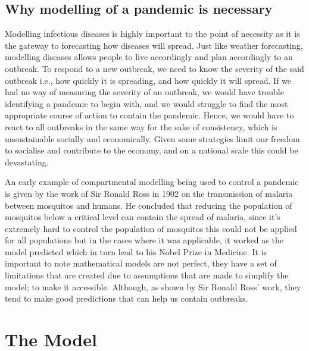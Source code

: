 \documentclass[11pt]{article}
\begin{document}
\subsection{Why modelling of a pandemic is necessary}
Modelling infectious diseases is highly important to the point of necessity as it is the gateway to forecasting how diseases will spread. Just like weather forecasting, modelling diseases allows people to live accordingly and plan accordingly to an outbreak. To respond to a new outbreak, we need to know the severity of the said outbreak i.e., how quickly it is spreading, and how quickly it will spread. If we had no way of measuring the severity of an outbreak, we would have trouble identifying a pandemic to begin with, and we would struggle to find the most appropriate course of action to contain the pandemic. Hence, we would have to react to all outbreaks in the same way for the sake of consistency, which is unsustainable socially and economically. Given some strategies limit our freedom to socialise and contribute to the economy, and on a national scale this could be devastating. \par
An early example of compartmental modelling being used to control a pandemic is given by the work of Sir Ronald Ross in 1902 on the transmission of malaria between mosquitos and humans. He concluded that reducing the population of mosquitos below a critical level can contain the spread of malaria, since it’s extremely hard to control the population of mosquitos this could not be applied for all populations but in the cases where it was applicable, it worked as the model predicted which in turn lead to his Nobel Prize in Medicine\citep{brauer2019introduction}. It is important to note mathematical models are not perfect, they have a set of limitations that are created due to assumptions that are made to simplify the model; to make it accessible. Although, as shown by Sir Ronald Ross’ work, they tend to make good predictions that can help us contain outbreaks.
\section{The Model}
\end{document}
